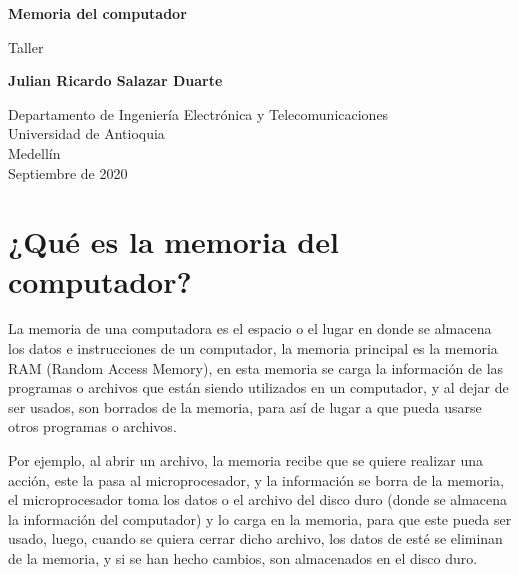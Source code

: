 \documentclass{article}
\begin{document}
\begin{titlepage}
    \begin{center}
        \vspace*{1cm}
            
        \Huge
        \textbf{Memoria del computador}
            
        \vspace{0.5cm}
        \LARGE
        Taller
            
        \vspace{1.5cm}
            
        \textbf{Julian Ricardo Salazar Duarte}
            
        \vfill
            
        \vspace{0.8cm}
            
        \Large
        Departamento de Ingeniería Electrónica y Telecomunicaciones\\
        Universidad de Antioquia\\
        Medellín\\
        Septiembre de 2020
            
    \end{center}
\end{titlepage}

\tableofcontents

\newpage

\section{¿Qué es la memoria del computador?}
La memoria de una computadora es el espacio o el lugar en donde se almacena los datos e instrucciones de un computador, la memoria principal es la memoria RAM (Random Access Memory), en esta memoria se carga la información de las programas o archivos que están siendo utilizados en un computador, y al dejar de ser usados, son borrados de la memoria, para así de lugar a que pueda usarse otros programas o archivos.
\vspace{0.5cm}

Por ejemplo, al abrir un archivo, la memoria recibe que se quiere realizar una acción, este la pasa al microprocesador, y la información se borra de la memoria, el microprocesador toma los datos o el archivo del disco duro (donde se almacena la información del computador) y lo carga en la memoria, para que este pueda ser usado, luego, cuando se quiera cerrar dicho archivo, los datos de esté se eliminan de la memoria, y si se han hecho cambios, son almacenados en el disco duro.\cite{Salazar}
\end{document}
